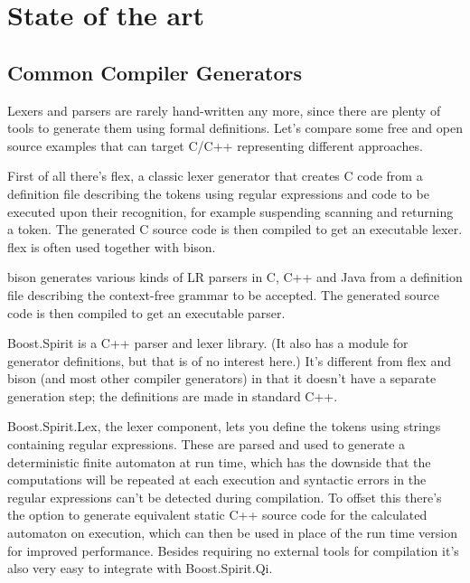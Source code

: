 
\chapter{State of the art}
        
        
	\section{Common Compiler Generators}
    	
		Lexers and parsers are rarely hand-written any more, since there are plenty of tools to generate them using formal definitions. Let's compare some free and open source examples that can target C/C++ representing different approaches.
		
		First of all there's flex\cite{flex}, a classic lexer generator that creates C code from a definition file describing the tokens using regular expressions and code to be executed upon their recognition, for example suspending scanning and returning a token. The generated C source code is then compiled to get an executable lexer. flex is often used together with bison.
		
		bison\cite{bison} generates various kinds of LR parsers in C, C++ and Java from a definition file describing the context-free grammar to be accepted. The generated source code is then compiled to get an executable parser.
		
		Boost.Spirit\cite{spirit} is a C++ parser and lexer library. (It also has a module for generator definitions, but that is of no interest here.) It's different from flex and bison (and most other compiler generators) in that it doesn't have a separate generation step; the definitions are made in standard C++.
		
		Boost.Spirit.Lex, the lexer component, lets you define the tokens using strings containing regular expressions. These are parsed and used to generate a deterministic finite automaton at run time, which has the downside that the computations will be repeated at each execution and syntactic errors in the regular expressions can't be detected during compilation. To offset this there's the option to generate equivalent static C++ source code for the calculated automaton on execution, which can then be used in place of the run time version for improved performance. Besides requiring no external tools for compilation it's also very easy to integrate with Boost.Spirit.Qi.
		
